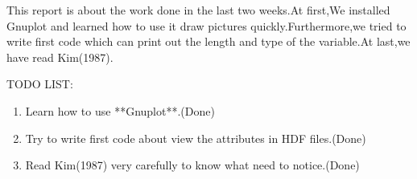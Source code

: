 \par
This report is about the work done in the last two weeks.At first,We installed Gnuplot and learned how to use it draw pictures quickly.Furthermore,we tried to write first code which can print out the length and type of the variable.At last,we have read Kim(1987).

TODO LIST\@:
\begin{enumerate}
    \item Learn how to use **Gnuplot**.(Done)
    \item Try to write  first code about view the attributes in HDF files.(Done)
    \item Read Kim(1987) very carefully to know what need to notice.(Done)
\end{enumerate}













































